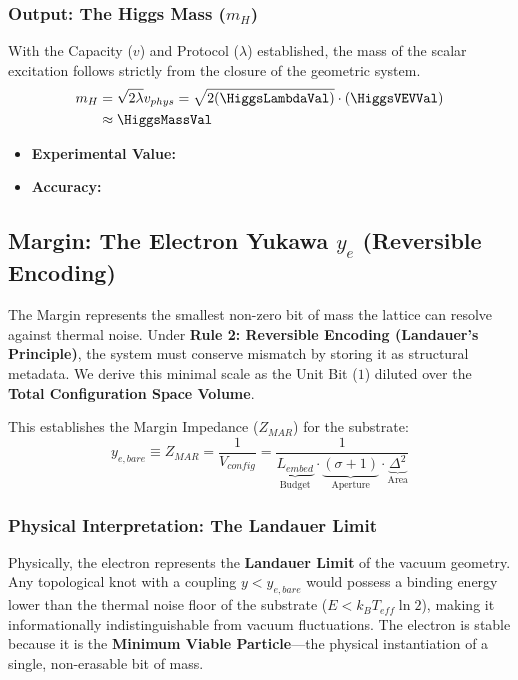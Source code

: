 \subsubsection{Output: The Higgs Mass (\texorpdfstring{$m_H$}{mH})}
With the Capacity ($v$) and Protocol ($\lambda$) established, the mass of the scalar excitation follows strictly from the closure of the geometric system.
\begin{equation}
\begin{split}
m_H &= \sqrt{2\lambda} v_{phys} = \sqrt{2 (\HiggsLambdaVal)} \cdot (\HiggsVEVVal) \\
& \approx \mathbf{\HiggsMassVal}
\end{split}
\end{equation}
\begin{itemize}
    \item \textbf{Experimental Value:} \HiggsMassExperimentalValue
    \item \textbf{Accuracy:} \HiggsMassAccText
\end{itemize}

\subsection{Margin: The Electron Yukawa \texorpdfstring{$y_e$}{ye} (Reversible Encoding)}
\label{subsec:margin_electron}
The Margin represents the smallest non-zero bit of mass the lattice can resolve against thermal noise. Under \textbf{Rule 2: Reversible Encoding (Landauer's Principle)}, the system must conserve mismatch by storing it as structural metadata. We derive this minimal scale as the Unit Bit ($1$) diluted over the \textbf{Total Configuration Space Volume}. 

This establishes the Margin Impedance ($Z_{MAR}$)\cite{meyer_informational_2026} for the substrate:
\begin{equation}
y_{e,bare} \equiv Z_{MAR} = \frac{1}{V_{config}} = \frac{1}{\underbrace{L_{embed}}_{\text{Budget}} \cdot \underbrace{(\sigma+1)}_{\text{Aperture}} \cdot \underbrace{\Delta^2}_{\text{Area}}}
\end{equation}

\subsubsection{Physical Interpretation: The Landauer Limit}
Physically, the electron represents the \textbf{Landauer Limit} of the vacuum geometry. Any topological knot with a coupling $y < y_{e,bare}$ would possess a binding energy lower than the thermal noise floor of the substrate ($E < k_B T_{eff} \ln 2$), making it informationally indistinguishable from vacuum fluctuations. The electron is stable because it is the \textbf{Minimum Viable Particle}—the physical instantiation of a single, non-erasable bit of mass.


